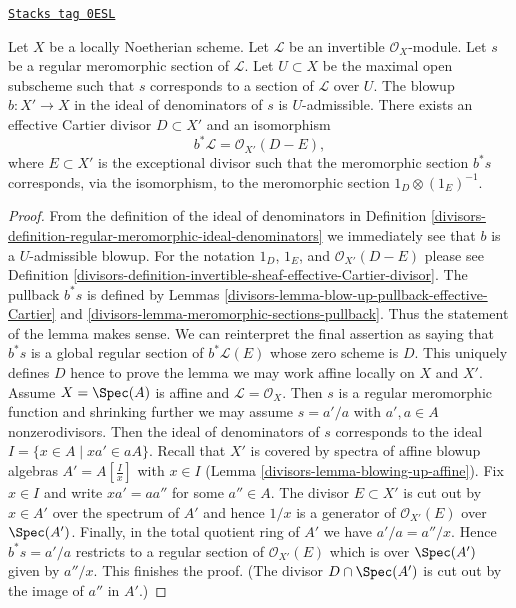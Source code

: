 \begin{lemma}
\label{divisors-lemma-blowing-up-denominators}
\href{https://stacks.math.columbia.edu/tag/0ESL}{\texttt{Stacks tag 0ESL}}

Let $X$ be a locally Noetherian scheme.
Let $\mathcal{L}$ be an invertible $\mathcal{O}_X$-module.
Let $s$ be a regular meromorphic section of $\mathcal{L}$.
Let $U \subset X$ be the maximal open subscheme such that
$s$ corresponds to a section of $\mathcal{L}$ over $U$.
The blowup $b : X' \to X$ in the ideal of denominators
of $s$ is $U$-admissible. There exists an effective Cartier divisor
$D \subset X'$ and an isomorphism
$$
b^*\mathcal{L} = \mathcal{O}_{X'}(D - E),
$$
where $E \subset X'$ is the exceptional divisor such that the
meromorphic section $b^*s$ corresponds, via the isomorphism,
to the meromorphic section $1_D \otimes (1_E)^{-1}$.
\end{lemma}

\begin{proof}

From the definition of the ideal of denominators in
Definition
\ref{divisors-definition-regular-meromorphic-ideal-denominators}
we immediately see that $b$ is a $U$-admissible blowup.
For the notation $1_D$, $1_E$, and $\mathcal{O}_{X'}(D - E)$
please see Definition
\ref{divisors-definition-invertible-sheaf-effective-Cartier-divisor}.
The pullback $b^*s$ is defined by
Lemmas \ref{divisors-lemma-blow-up-pullback-effective-Cartier} and
\ref{divisors-lemma-meromorphic-sections-pullback}.
Thus the statement of the lemma makes sense.
We can reinterpret the final assertion as saying
that $b^*s$ is a global regular section of
$b^*\mathcal{L}(E)$ whose zero scheme is $D$.
This uniquely defines $D$ hence
to prove the lemma we may work affine locally on $X$ and $X'$.
Assume $X = \Spec(A)$ is affine and
$\mathcal{L} = \mathcal{O}_X$. Then $s$ is a regular meromorphic
function and shrinking further we may assume
$s = a'/a$ with $a', a \in A$ nonzerodivisors.
Then the ideal of denominators of $s$ corresponds
to the ideal $I = \{x \in A \mid xa' \in aA\}$.
Recall that $X'$ is covered by spectra of affine blowup
algebras $A' = A[\frac{I}{x}]$ with $x \in I$
(Lemma \ref{divisors-lemma-blowing-up-affine}). Fix $x \in I$ and
write $xa' = a a''$ for some $a'' \in A$.
The divisor $E \subset X'$ is cut out by $x \in A'$ over
the spectrum of $A'$ and hence $1/x$ is a
generator of $\mathcal{O}_{X'}(E)$ over $\Spec(A')$.
Finally, in the total quotient ring
of $A'$ we have $a'/a = a''/x$. Hence $b^*s = a'/a$ restricts
to a regular section of $\mathcal{O}_{X'}(E)$ which is
over $\Spec(A')$ given by $a''/x$. This finishes the proof.
(The divisor $D \cap \Spec(A')$ is cut out by the image of
$a''$ in $A'$.)
\end{proof}

